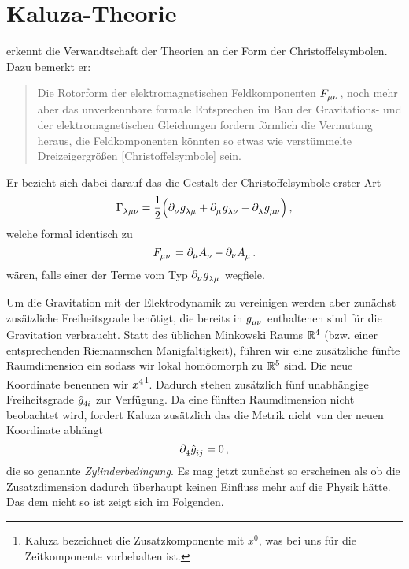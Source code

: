\section{Kaluza-Theorie}
 erkennt die Verwandtschaft der Theorien an der Form der
Christoffelsymbolen. Dazu bemerkt er\cite{kaluza1921unitatsproblem}:
\begin{quote}
Die Rotorform der elektromagnetischen Feldkomponenten
$\tensor{F}{_\mu_\nu}$, noch mehr aber das
unverkennbare formale Entsprechen im Bau der Gravitations- 
und der elektromagnetischen Gleichungen fordern förmlich
die Vermutung heraus, die Feldkomponenten könnten so etwas wie
verstümmelte Dreizeigergrößen [Christoffelsymbole] sein.
\end{quote}
Er bezieht sich dabei darauf das die Gestalt der Christoffelsymbole erster Art
\begin{equation}
\tensor*{\Gamma}{_\lambda_\mu_\nu}=\frac{1}{2}
\left(\tensor{\partial}{_\nu} \tensor{g}{_\lambda_\mu} +
\tensor{\partial}{_\mu}
\tensor{g}{_\lambda_\nu} - \tensor{\partial}{_\lambda} 
\tensor{g}{_\mu_\nu}\right)\,,
\end{equation}
welche formal identisch zu 
\begin{equation}
\tensor{F}{_\mu_\nu}=\partial_\mu\tensor{A}{_\nu}-\partial_\nu\tensor{A}{_\mu}\,.
\end{equation}
wären, falls einer der Terme vom Typ $\tensor{\partial}{_\nu}
\tensor{g}{_\lambda_\mu}$ wegfiele.

Um die Gravitation mit der Elektrodynamik zu vereinigen werden aber zunächst 
zusätzliche Freiheitsgrade benötigt, die bereits in $\tensor{g}{_\mu_\nu}$
enthaltenen sind für die Gravitation verbraucht.
Statt des üblichen Minkowski Raums $\mathbb{R}^4$ (bzw. einer entsprechenden
Riemannschen Manigfaltigkeit), führen wir eine zusätzliche fünfte Raumdimension
ein sodass wir lokal homöomorph zu $\mathbb{R}^5$ sind. 
Die neue Koordinate benennen wir $\tensor{x}{^4}$\footnote{Kaluza
bezeichnet die Zusatzkomponente mit $x^0$, was bei uns für die Zeitkomponente
vorbehalten ist.}.
Dadurch stehen zusätzlich fünf
unabhängige Freiheitsgrade $\tensor{\hat{g}}{_4_i}$ zur Verfügung. Da eine
fünften Raumdimension nicht beobachtet wird, fordert Kaluza zusätzlich das die
Metrik nicht von der neuen Koordinate abhängt
\begin{equation}
\tensor{\partial}{_4} \tensor{\hat{g}}{_i_j}=0\,,\label{eq:Zylinderbed}
\end{equation}
die so genannte \emph{Zylinderbedingung}.
Es mag jetzt zunächst so erscheinen als ob die Zusatzdimension dadurch überhaupt
keinen Einfluss mehr auf die Physik hätte. Das dem nicht so ist zeigt sich im
Folgenden.

